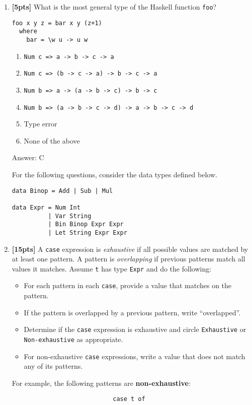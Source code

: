 \documentclass[paper=letter, fontsize=13pt]{article} %
\numberwithin{equation}{section} %
\newif\ifshowanswers\showanswerstrue
\begin{document}
\begin{enumerate}
\item \textbf{[5pts]} What is the most general type of the Haskell function \texttt{foo}?
\begin{lstlisting}
foo x y z = bar x y (z+1)
  where
    bar = \w u -> u w
\end{lstlisting}
    \begin{enumerate} 
         \item \verb|Num c => a -> b -> c -> a|
         \item \verb|Num c => (b -> c -> a) -> b -> c -> a|
         \item \verb|Num b => a -> (a -> b -> c) -> b -> c|
         \item \verb|Num b => (a -> b -> c -> d) -> a -> b -> c -> d|
         \item Type error
         \item None of the above
     \end{enumerate}
\ifshowanswers
Answer: C
\fi

\newpage
For the following questions, consider the data types defined below.
\begin{lstlisting}
data Binop = Add | Sub | Mul

data Expr = Num Int              
          | Var String
          | Bin Binop Expr Expr  
          | Let String Expr Expr     

\end{lstlisting}

\item \textbf{[15pts]} A \texttt{case} expression is \textit{exhaustive} if all possible values are matched
by at least one pattern. A pattern is \textit{overlapping} if previous patterns match all values it matches.
Assume \texttt{t} has type \texttt{Expr} and do the following:
\begin{itemize}
  \item For each pattern in each \texttt{case}, provide a value that matches on the pattern.
  \item If the pattern is overlapped by a previous pattern, write ``overlapped''.
  \item Determine if the \texttt{case} expression is exhaustive and circle \texttt{Exhaustive} or \texttt{Non-exhaustive} as appropriate.
  \item For non-exhaustive \texttt{case} expressions, write a value that does not match any of its patterns.
\end{itemize}
For example, the following patterns are \textbf{non-exhaustive}: 
\begin{lstlisting}
                            case t of


\end{lstlisting}
\end{enumerate}
\end{document}
